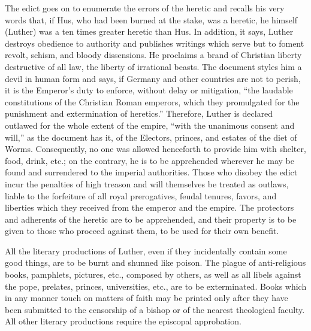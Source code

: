 The edict goes on to enumerate the errors of the heretic and recalls his
very words that, if Hus, who had been burned at the stake, was a heretic, he
himself (Luther) was a ten times greater heretic than Hus. In addition, it
says, Luther destroys obedience to authority and publishes writings which
serve but to foment revolt, schism, and bloody dissensions. He proclaims
a brand of Christian liberty destructive of all law, the liberty of irrational
beasts. The document styles him a devil in human form and says, if Germany
and other countries are not to perish, it is the Emperor’s duty to enforce,
without delay or mitigation, “the laudable constitutions of the Christian
Roman emperors, which they promulgated for the punishment and extermination
of heretics.” Therefore, Luther is declared outlawed for the whole
extent of the empire, “with the unanimous consent and will,” as the document
has it, of the Electors, princes, and estates of the diet of Worms.
Consequently, no one was allowed henceforth to provide him with shelter,
food, drink, etc.; on the contrary, he is to be apprehended wherever he may
be found and surrendered to the imperial authorities. Those who disobey the
edict incur the penalties of high treason and will themselves be treated as
outlaws, liable to the forfeiture of all royal prerogatives, feudal tenures,
favors, and liberties which they received from the emperor and the empire.
The protectors and adherents of the heretic are to be apprehended, and their
property is to be given to those who proceed against them, to be used for
their own benefit.

All the literary productions of Luther, even if they incidentally contain
some good things, are to be burnt and shunned like poison. The plague of
anti-religious books, pamphlets, pictures, etc., composed by others, as well
as all libels against the pope, prelates, princes, universities, etc., are to be
exterminated. Books which in any manner touch on matters of faith may be
printed only after they have been submitted to the censorship of a bishop or
of the nearest theological faculty. All other literary productions require the
episcopal approbation.

